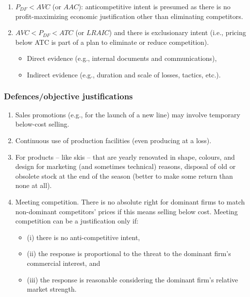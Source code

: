         \begin{enumerate}
            \item \( P_{DF} < AVC \) (or \( AAC \)): anticompetitive intent is presumed as there is no profit-maximizing economic justification other than eliminating competitors.
            \item \( AVC < P_{DF} < ATC \) (or \( LRAIC \)) and there is exclusionary intent (i.e., pricing below ATC is part of a plan to eliminate or reduce competition).
            \begin{itemize}
                \item Direct evidence (e.g., internal documents and communications),
                \item Indirect evidence (e.g., duration and scale of losses, tactics, etc.).
            \end{itemize}
        \end{enumerate}

        \subsubsection{Defences/objective justifications}

            \begin{enumerate}
                \item Sales promotions (e.g., for the launch of a new line) may involve temporary below-cost selling.
                \item Continuous use of production facilities (even producing at a loss).
                \item For products – like skis – that are yearly renovated in shape, colours, and design for marketing (and sometimes technical) reasons, disposal of old or obsolete stock at the end of the season (better to make some return than none at all).
                \item Meeting competition. There is no absolute right for dominant firms to match non-dominant competitors’ prices if this means selling below cost. Meeting competition can be a justification only if:
                \begin{itemize}
                    \item (i) there is no anti-competitive intent,
                    \item (ii) the response is proportional to the threat to the dominant firm’s commercial interest, and
                    \item (iii) the response is reasonable considering the dominant firm’s relative market strength.
                \end{itemize}
            \end{enumerate}

